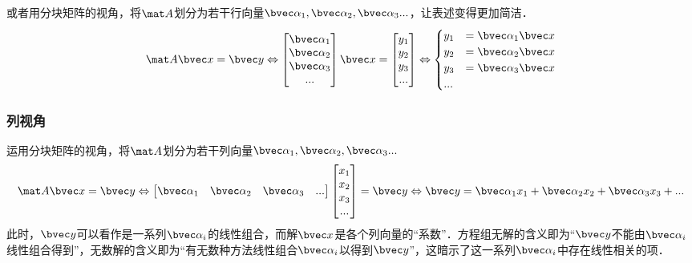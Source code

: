 或者用分块矩阵的视角，将$\mat A$划分为若干行向量$\bvec \alpha_1, \bvec \alpha_2,\bvec \alpha_3...$，让表述变得更加简洁．
$$
\mat A \bvec x=\bvec y \Leftrightarrow 
\begin{bmatrix}
\bvec \alpha_1\\
\bvec \alpha_2\\
\bvec \alpha_3\\
...
\end{bmatrix}
\bvec x
=
\begin{bmatrix}
y_{1}\\
y_{2}\\
y_{3}\\
...\\
\end{bmatrix}
\Leftrightarrow 
\begin{cases}
y_1&=\bvec \alpha_1 \bvec x\\
y_2&=\bvec \alpha_2 \bvec x\\
y_3&=\bvec \alpha_3 \bvec x\\
...&\\
\end{cases}
$$

\subsubsection{列视角}
运用分块矩阵的视角，将$\mat A$划分为若干列向量$\bvec \alpha_1, \bvec \alpha_2,\bvec \alpha_3...$
$$
\mat A \bvec x=\bvec y \Leftrightarrow 
\begin{bmatrix}
\bvec \alpha_1& \bvec \alpha_2& \bvec \alpha_3&...
\end{bmatrix}
\begin{bmatrix}
x_{1}\\
x_{2}\\
x_{3}\\
...\\
\end{bmatrix}
=
\bvec y
\Leftrightarrow 
\bvec y = \bvec \alpha_1 x_1+\bvec \alpha_2 x_2+\bvec \alpha_3 x_3+...
$$
此时，$\bvec y$可以看作是一系列$\bvec \alpha_i$的线性组合，而解$\bvec x$是各个列向量的“系数”．方程组无解的含义即为“$\bvec y$不能由$\bvec \alpha_i$线性组合得到”，无数解的含义即为“有无数种方法线性组合$\bvec \alpha_i$以得到$\bvec y$”，这暗示了这一系列$\bvec \alpha_i$中存在线性相关的项．

